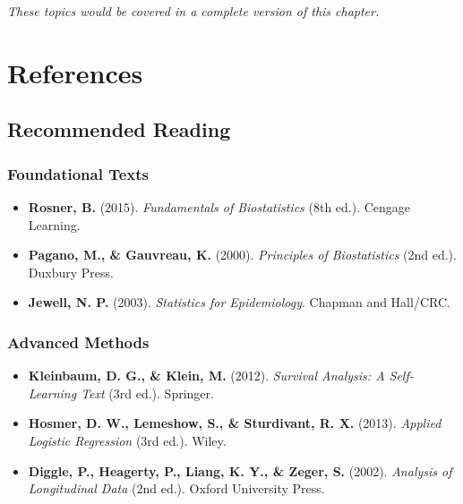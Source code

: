 \documentclass[
  11pt,
  letterpaper,
  oneside]{book}
\providecommand{\tightlist}{%
  \setlength{\itemsep}{0pt}\setlength{\parskip}{0pt}}\usepackage{longtable,booktabs,array}
\newlength{\cslhangindent}
\newenvironment{CSLReferences}[2] %
 {\begin{list}{}{%
  \setlength{\itemindent}{0pt}
  \setlength{\leftmargin}{0pt}
  \setlength{\parsep}{0pt}
  \ifodd #1
   \setlength{\leftmargin}{\cslhangindent}
   \setlength{\itemindent}{-1\cslhangindent}
  \fi
  \setlength{\itemsep}{#2\baselineskip}}}
 {\end{list}}
\begin{document}
\emph{These topics would be covered in a complete version of this
chapter.}


\chapter*{References}\label{references}


\label{refs}
\begin{CSLReferences}{0}{1}
\end{CSLReferences}

\section*{Recommended Reading}\label{recommended-reading}


\subsection*{Foundational Texts}\label{foundational-texts}

\begin{itemize}
\tightlist
\item
  \textbf{Rosner, B.} (2015). \emph{Fundamentals of Biostatistics} (8th
  ed.). Cengage Learning.
\item
  \textbf{Pagano, M., \& Gauvreau, K.} (2000). \emph{Principles of
  Biostatistics} (2nd ed.). Duxbury Press.
\item
  \textbf{Jewell, N. P.} (2003). \emph{Statistics for Epidemiology}.
  Chapman and Hall/CRC.
\end{itemize}

\subsection*{Advanced Methods}\label{advanced-methods}

\begin{itemize}
\tightlist
\item
  \textbf{Kleinbaum, D. G., \& Klein, M.} (2012). \emph{Survival
  Analysis: A Self-Learning Text} (3rd ed.). Springer.
\item
  \textbf{Hosmer, D. W., Lemeshow, S., \& Sturdivant, R. X.} (2013).
  \emph{Applied Logistic Regression} (3rd ed.). Wiley.
\item
  \textbf{Diggle, P., Heagerty, P., Liang, K. Y., \& Zeger, S.} (2002).
  \emph{Analysis of Longitudinal Data} (2nd ed.). Oxford University
  Press.
\end{itemize}
\end{document}
